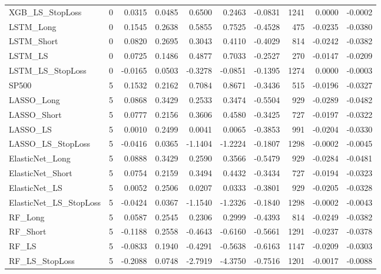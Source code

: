 \begin{tabular}{llrrrrrrrr}
\cline{1-10}
XGB\_LS\_StopLoss & 0 & 0.0315 & 0.0485 & 0.6500 & 0.2463 & -0.0831 & 1241 & 0.0000 & -0.0002 \\
\cline{1-10}
LSTM\_Long & 0 & 0.1545 & 0.2638 & 0.5855 & 0.7525 & -0.4528 & 475 & -0.0235 & -0.0380 \\
\cline{1-10}
LSTM\_Short & 0 & 0.0820 & 0.2695 & 0.3043 & 0.4110 & -0.4029 & 814 & -0.0242 & -0.0382 \\
\cline{1-10}
LSTM\_LS & 0 & 0.0725 & 0.1486 & 0.4877 & 0.7033 & -0.2527 & 270 & -0.0147 & -0.0209 \\
\cline{1-10}
LSTM\_LS\_StopLoss & 0 & -0.0165 & 0.0503 & -0.3278 & -0.0851 & -0.1395 & 1274 & 0.0000 & -0.0003 \\
\cline{1-10}
SP500 & 5 & 0.1532 & 0.2162 & 0.7084 & 0.8671 & -0.3436 & 515 & -0.0196 & -0.0327 \\
\cline{1-10}
LASSO\_Long & 5 & 0.0868 & 0.3429 & 0.2533 & 0.3474 & -0.5504 & 929 & -0.0289 & -0.0482 \\
\cline{1-10}
LASSO\_Short & 5 & 0.0777 & 0.2156 & 0.3606 & 0.4580 & -0.3425 & 727 & -0.0197 & -0.0322 \\
\cline{1-10}
LASSO\_LS & 5 & 0.0010 & 0.2499 & 0.0041 & 0.0065 & -0.3853 & 991 & -0.0204 & -0.0330 \\
\cline{1-10}
LASSO\_LS\_StopLoss & 5 & -0.0416 & 0.0365 & -1.1404 & -1.2224 & -0.1807 & 1298 & -0.0002 & -0.0045 \\
\cline{1-10}
ElasticNet\_Long & 5 & 0.0888 & 0.3429 & 0.2590 & 0.3566 & -0.5479 & 929 & -0.0284 & -0.0481 \\
\cline{1-10}
ElasticNet\_Short & 5 & 0.0754 & 0.2159 & 0.3494 & 0.4432 & -0.3434 & 727 & -0.0194 & -0.0323 \\
\cline{1-10}
ElasticNet\_LS & 5 & 0.0052 & 0.2506 & 0.0207 & 0.0333 & -0.3801 & 929 & -0.0205 & -0.0328 \\
\cline{1-10}
ElasticNet\_LS\_StopLoss & 5 & -0.0424 & 0.0367 & -1.1540 & -1.2326 & -0.1840 & 1298 & -0.0002 & -0.0043 \\
\cline{1-10}
RF\_Long & 5 & 0.0587 & 0.2545 & 0.2306 & 0.2999 & -0.4393 & 814 & -0.0249 & -0.0382 \\
\cline{1-10}
RF\_Short & 5 & -0.1188 & 0.2558 & -0.4643 & -0.6160 & -0.5661 & 1291 & -0.0237 & -0.0378 \\
\cline{1-10}
RF\_LS & 5 & -0.0833 & 0.1940 & -0.4291 & -0.5638 & -0.6163 & 1147 & -0.0209 & -0.0303 \\
\cline{1-10}
RF\_LS\_StopLoss & 5 & -0.2088 & 0.0748 & -2.7919 & -4.3750 & -0.7516 & 1201 & -0.0017 & -0.0088 \\

\end{tabular}
